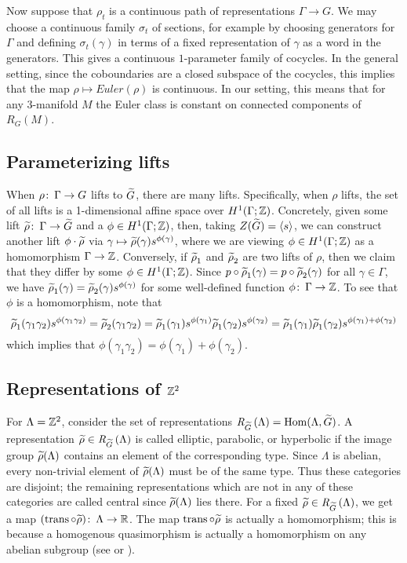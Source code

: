 \documentclass[tikz, sepfignums, defaultenums]{nmd/article}
\newcommand{\G}{G}
\newcommand{\RG}[1]{\mathit{R}_{G}\left(#1\right)}
\newcommand{\RGtil}[1]{\mathit{R}_{\Gtil}\left(#1\right)}
\DeclareMathOperator{\trans}{trans}
\newcommand{\euler}[1]{\mathit{Euler}\left(#1\right)}
\begin{document}
Now suppose that $\rho_t$ is a continuous path of representations
$\Gamma \to \G$.  We
may choose a continuous family $\sigma_t$ of sections, for example by
choosing generators for $\Gamma$ and defining $\sigma_t(\gamma)$ in terms
of a fixed representation of $\gamma$ as a word in the generators.
This gives a continuous $1$-parameter family of cocycles.  In the general
setting, since the coboundaries are a closed subspace of the cocycles,
this implies that the map $\rho \mapsto \euler{\rho}$ is continuous.
In our setting, this means that for any $3$-manifold $M$ the Euler
class is constant on connected components of $\RG{M}$.

\subsection{Parameterizing lifts} \label{sec:paramlifts}

When $\rho \maps \Gamma \to \G$ lifts to $\Gtil$, there are many
lifts. Specifically, when $\rho$ lifts, the set of all lifts is
a 1-dimensional affine space over $H^1(\Gamma; {\mathbb Z})$.  Concretely,
given some lift $\rhotil \maps \Gamma \to \Gtil$ and a
$\phi \in H^1(\Gamma; {\mathbb Z})$, then, taking
$Z(\Gtil) = \langle s\rangle$, we can construct another lift
$\phi \cdot \rhotil$ via
$\gamma\mapsto \rhotil(\gamma) s^{\phi(\gamma)}$, where we are viewing
$\phi\in H^1(\Gamma; {\mathbb Z})$ as a homomorphism $\Gamma \to {\mathbb Z}$.
Conversely, if $\rhotil_1$ and $\rhotil_2$ are two lifts of $\rho$, then
we claim that they differ by some $\phi \in H^1(\Gamma; {\mathbb Z})$.  Since
$p\circ\rhotil_1(\gamma) = p\circ\rhotil_2(\gamma)$ for all $\gamma\in\Gamma$,
we have $\rhotil_1(\gamma) = \rhotil_2(\gamma)s^{\phi(\gamma)}$ for
some well-defined function $\phi \colon\thinspace \Gamma\to{\mathbb Z}$.  To see that $\phi$ is
a homomorphism, note that
$$
\rhotil_1(\gamma_1\gamma_2)s^{\phi(\gamma_1\gamma_2)} =
\rhotil_2(\gamma_1\gamma_2) =
\rhotil_1(\gamma_1)s^{\phi(\gamma_1)}\rhotil_1(\gamma_2)s^{\phi(\gamma_2)} =
\rhotil_1(\gamma_1)\rhotil_1(\gamma_2)s^{\phi(\gamma_1) + \phi(\gamma_2)}
$$
which implies that $\phi(\gamma_1\gamma_2) = \phi(\gamma_1) + \phi(\gamma_2)$.
\subsection{Representations of ${\mathbb Z}^2$}
\label{sec:repsZZ}

For $\Lambda = {\mathbb Z}^2$, consider the set of representations
$\RGtil{\Lambda} = \Hom(\Lambda, \Gtil)$.  A representation
$\rhotil \in \RGtil{\Lambda}$ is called elliptic, parabolic, or
hyperbolic if the image group $\rhotil(\Lambda)$ contains an element
of the corresponding type.  Since $\Lambda$ is abelian, every
non-trivial element of $\rhotil(\Lambda)$ must be of the same type.
Thus these categories are disjoint; the remaining representations
which are not in any of these categories are called central since
$\rhotil(\Lambda)$ lies there.  For a fixed
$\rhotil \in \RGtil{\Lambda}$, we get a map
$(\trans \circ \rhotil) \maps \Lambda \to \R$.  The map
$\trans \circ \rhotil$ is actually a homomorphism; this is because a
homogenous quasimorphism is actually a homomorphism on any abelian
subgroup (see \cite[Prop.~2.65]{Calegari2009} or
\cite[Theorem~6.16]{Ghys2001}).
\end{document}
